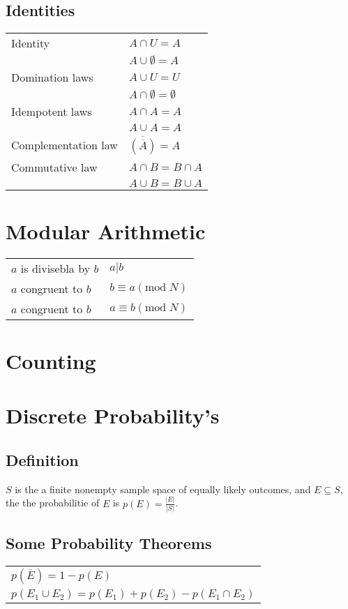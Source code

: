 \documentclass[5pt]{article}
\begin{document}
\begin{multicols}{2}
\subsection{Identities}
\begin{tabular}{ll}
    Identity            & $A\cap U=A$ \\
                        & $A\cup \emptyset=A$ \\
    Domination laws     & $A\cup U=U$ \\
                        & $A\cap \emptyset=\emptyset$ \\
    Idempotent laws     & $A\cap A = A$ \\
                        & $A\cup A = A$ \\
    Complementation law & $\overline{(\overline{A})}=A$ \\
    Commutative law     & $A\cap B=B\cap A$\\
                        & $A\cup B=B\cup A$\\   
\end{tabular}

\section{Modular Arithmetic}
\begin{tabular}{ll}
    $a$ is divisebla by $b$ & $a|b$ \\
    $a$ congruent to $b$  & $b\equiv a(\text{mod}\; N)$\\
    $a$ congruent to $b$  & $a\equiv b(\text{mod}\; N)$\\
\end{tabular}

\section{Counting}

\section{Discrete Probability's}
\subsection{Definition}
$S$ is the a finite nonempty sample space of equally likely outcomes, and $E\subseteq S$, the the probabilitie of $E$ is $p(E)=\frac{|E|}{|S|}$.

\subsection{Some Probability Theorems}
\begin{tabular}{l}
    $p(\overline{E})=1-p(E)$\\
    $p(E_1\cup E_2)=p(E_1)+p(E_2)-p(E_1\cap E_2)$\\
\end{tabular}



\end{multicols}
\end{document}
